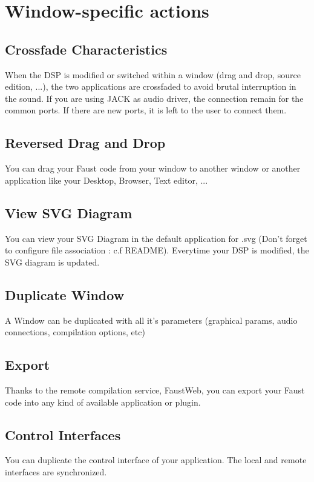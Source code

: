 \documentclass[a4paper]{article}
\begin{document}
\section{Window-specific actions}

\subsection{Crossfade Characteristics}

When the DSP is modified or switched within a window (drag and drop, source edition, ...), the two applications are crossfaded to avoid brutal interruption in the sound. If you are using JACK as audio driver, the connection remain for the common ports. If there are new ports, it is left to the user to connect them. 

\subsection{Reversed Drag and Drop}
You can drag your Faust code from your window to another window or another application like your Desktop, Browser, Text editor, ...

\subsection{View SVG Diagram}
You can view your SVG Diagram in the default application for .svg (Don't forget to configure file association : c.f README). Everytime your DSP is modified, the SVG diagram is updated.

\subsection{Duplicate Window}
A Window can be duplicated with all it's parameters (graphical params, audio connections, compilation options, etc)

\subsection{Export}
Thanks to the remote compilation service, FaustWeb, you can export your Faust code into any kind of available application or plugin. 

\subsection{Control Interfaces}
You can duplicate the control interface of your application. The local and remote interfaces are synchronized.
\end{document}
